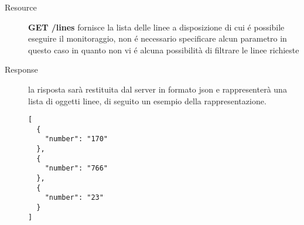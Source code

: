 \begin{description}
	\item[Resource] \textbf{GET /lines} fornisce la lista delle linee a disposizione di cui é possibile eseguire il monitoraggio, non é necessario specificare alcun parametro in questo caso in quanto non vi é alcuna possibilità di filtrare le linee richieste
	\item[Response] la risposta sarà restituita dal server in formato json e rappresenterà una lista di oggetti linee, di seguito un esempio della rappresentazione.

	\begin{verbatim}
[
  {
    "number": "170"
  },
  {
    "number": "766"
  },
  {
    "number": "23"
  }
]
	\end{verbatim}
\end{description}